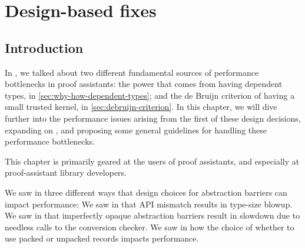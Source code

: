 \chapter{Design-based fixes} \label{ch:design} \label{ch:api-design}

\section{Introduction}
In , we talked about two different fundamental sources of performance bottlenecks in proof assistants:
the power that comes from having dependent types, in \autoref{sec:why-how-dependent-types};
and the de Bruijn criterion of having a small trusted kernel, in \autoref{sec:debruijn-criterion}.
In this chapter, we will dive further into the performance issues arising from the first of these design decisions, expanding on , and proposing some general guidelines for handling these performance bottlenecks.

This chapter is primarily geared at the users of proof assistants, and especially at proof-assistant library developers.

We saw in  three different ways that design choices for abstraction barriers can impact performance:
We saw in  that API mismatch results in type-size blowup.
We saw in  that imperfectly opaque abstraction barriers result in slowdown due to needless calls to the conversion checker.
We saw in  how the choice of whether to use packed or unpacked records impacts performance.

